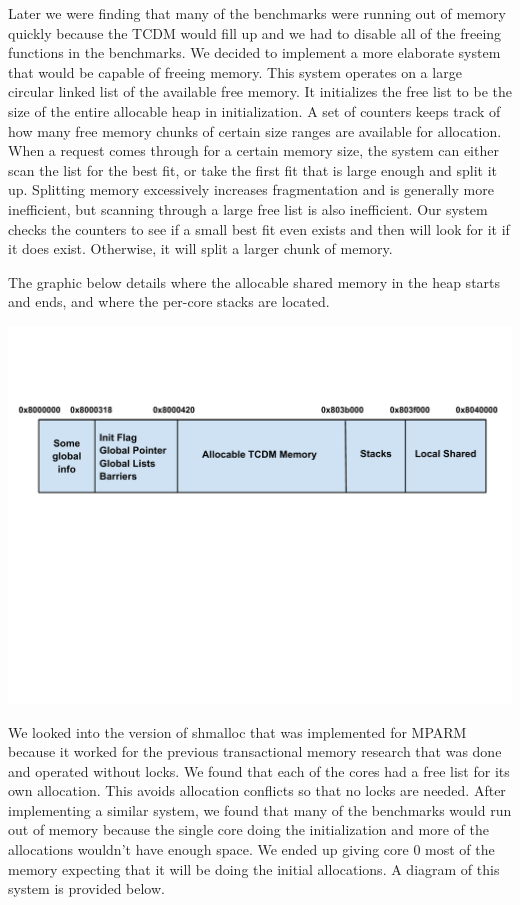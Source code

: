 \documentclass{article}
\begin{document}
Later we were finding that many of the benchmarks were running out of memory quickly because the TCDM
would fill up and we had to disable all of the freeing functions in the benchmarks.  We decided to implement 
a more elaborate system that would be capable of freeing memory.  This system operates on a large circular 
linked list of the available free memory. It initializes the free list to be the size of the entire allocable heap in
initialization.  A set of counters keeps track of how many free memory chunks of certain size ranges are available
for allocation. When a request comes through for a certain memory size, the system can either scan the list for
the best fit, or take the first fit that is large enough and split it up.  Splitting memory excessively increases fragmentation
and is generally more inefficient, but scanning through a large free list is also inefficient. Our system checks the counters 
to see if a small best fit even exists and then will look for it if it does exist.  Otherwise, it will split a larger chunk of memory. 

The graphic below details where the allocable shared memory in the heap starts and ends, and where the per-core
stacks are located. 

\begin{center}
\includegraphics[scale = .65]{pictures/Memory_Map.pdf}
\end{center}

We looked into the version of shmalloc that was implemented for MPARM because it worked for the previous
transactional memory research that was done and operated without locks.  We found that each of the cores 
had a free list for its own allocation. This avoids allocation conflicts so that no locks are needed.  After implementing
a similar system, we found that many of the benchmarks would run out of memory because the single core
doing the initialization and more of the allocations wouldn't have enough space.  We ended up giving core 0 most of
the memory expecting that it will be doing the initial allocations.  A diagram of this system is provided below. 
\end{document}
